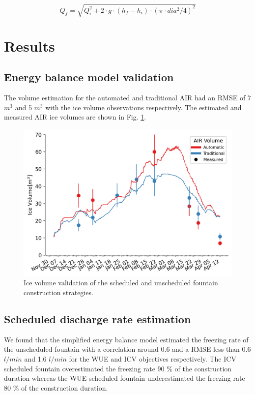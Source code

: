 \documentclass[tc, manuscript]{copernicus}
\begin{document}
\begin{equation}
  \label{eqn:discharge}
  Q_f = \sqrt{Q_i^2 + 2 \cdot g \cdot (h_f-h_i) \cdot (\pi \cdot dia^2/4)^2}
\end{equation}


\section{Results}

\subsection{Energy balance model validation}

The volume estimation for the automated and traditional AIR had an RMSE of 7 $m^3$ and 5 $m^3$ with the ice
volume observations respectively. The estimated and measured AIR ice volumes are shown in Fig.
\ref{fig:validation}.
 
\begin{figure}[t] \includegraphics[width=12cm]
  {Figures/validation.png} 
  \caption{Ice volume validation of the scheduled and unscheduled fountain construction strategies.} 
\label{fig:validation} 
\end{figure}

\subsection{Scheduled discharge rate estimation}

We found that the simplified energy balance model estimated the freezing rate of the unscheduled fountain with a
correlation around 0.6 and a RMSE less than 0.6 $l/min$ and 1.6  $l/min$ for the WUE and ICV objectives
respectively. The ICV scheduled fountain overestimated the freezing rate 90 \% of the construction duration
whereas the WUE scheduled fountain underestimated the freezing rate 80 \% of the construction duration.
\end{document}
